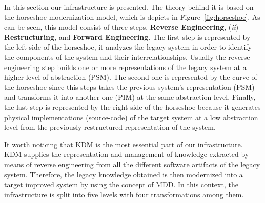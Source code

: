 In this section our infrastructure is presented. The theory behind it is based on the horseshoe modernization model, which is depicts in Figure~\ref{fig:horseshoe}. As can be seen, this model consist of three steps, \textbf{Reverse Engineering}, (\textit{ii}) \textbf{Restructuring}, and \textbf{Forward Engineering}. The first step is represented by the left side of the horseshoe, it analyzes the legacy system in order to identify the components of the system and their interrelationships. Usually the reverse engineering step builds one or more representations of the legacy system at a higher level of abstraction (PSM). The second one is represented by the curve of the horseshoe since this steps takes the previous system's representation (PSM) and transforms it into another one (PIM) at the same abstraction level. Finally, the last step is represented by the right side of the horseshoe because it generates physical implementations (source-code) of the target system at a low abstraction level from the previously restructured representation of the system.

It worth noticing that KDM is the most essential part of our infrastructure. KDM supplies the representation and management of knowledge extracted by means of reverse engineering from all the different software artifacts of the legacy system. Therefore, the legacy knowledge obtained is then modernized into a target improved system by using the concept of MDD. In this context, the infrastructure is split  into five levels with four transformations among them.


